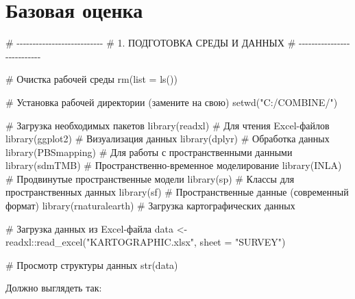 \documentclass[
  letterpaper,
  DIV=11,
  numbers=noendperiod]{scrreprt}
\newenvironment{Shaded}{\begin{snugshade}}{\end{snugshade}}
\newcommand{\AttributeTok}[1]{\textcolor[rgb]{0.40,0.45,0.13}{#1}}
\newcommand{\CommentTok}[1]{\textcolor[rgb]{0.37,0.37,0.37}{#1}}
\newcommand{\FunctionTok}[1]{\textcolor[rgb]{0.28,0.35,0.67}{#1}}
\newcommand{\NormalTok}[1]{\textcolor[rgb]{0.00,0.23,0.31}{#1}}
\newcommand{\OtherTok}[1]{\textcolor[rgb]{0.00,0.23,0.31}{#1}}
\newcommand{\SpecialCharTok}[1]{\textcolor[rgb]{0.37,0.37,0.37}{#1}}
\newcommand{\StringTok}[1]{\textcolor[rgb]{0.13,0.47,0.30}{#1}}
\begin{document}
\section{Базовая
оценка}\label{ux431ux430ux437ux43eux432ux430ux44f-ux43eux446ux435ux43dux43aux430}

\begin{Shaded}
\begin{Highlighting}[]
\CommentTok{\# {-}{-}{-}{-}{-}{-}{-}{-}{-}{-}{-}{-}{-}{-}{-}{-}{-}{-}{-}{-}{-}{-}{-}{-}{-}{-}{-}}
\CommentTok{\# 1. ПОДГОТОВКА СРЕДЫ И ДАННЫХ}
\CommentTok{\# {-}{-}{-}{-}{-}{-}{-}{-}{-}{-}{-}{-}{-}{-}{-}{-}{-}{-}{-}{-}{-}{-}{-}{-}{-}{-}{-}}

\CommentTok{\# Очистка рабочей среды}
\FunctionTok{rm}\NormalTok{(}\AttributeTok{list =} \FunctionTok{ls}\NormalTok{())}

\CommentTok{\# Установка рабочей директории (замените на свою)}
\FunctionTok{setwd}\NormalTok{(}\StringTok{"C:/COMBINE/"}\NormalTok{)}

\CommentTok{\# Загрузка необходимых пакетов}
\FunctionTok{library}\NormalTok{(readxl)       }\CommentTok{\# Для чтения Excel{-}файлов}
\FunctionTok{library}\NormalTok{(ggplot2)      }\CommentTok{\# Визуализация данных}
\FunctionTok{library}\NormalTok{(dplyr)        }\CommentTok{\# Обработка данных}
\FunctionTok{library}\NormalTok{(PBSmapping)   }\CommentTok{\# Для работы с пространственными данными}
\FunctionTok{library}\NormalTok{(sdmTMB)       }\CommentTok{\# Пространственно{-}временное моделирование}
\FunctionTok{library}\NormalTok{(INLA)         }\CommentTok{\# Продвинутые пространственные модели}
\FunctionTok{library}\NormalTok{(sp)           }\CommentTok{\# Классы для пространственных данных}
\FunctionTok{library}\NormalTok{(sf)           }\CommentTok{\# Пространственные данные (современный формат)}
\FunctionTok{library}\NormalTok{(rnaturalearth) }\CommentTok{\# Загрузка картографических данных}

\CommentTok{\# Загрузка данных из Excel{-}файла}
\NormalTok{data }\OtherTok{\textless{}{-}}\NormalTok{ readxl}\SpecialCharTok{::}\FunctionTok{read\_excel}\NormalTok{(}\StringTok{"KARTOGRAPHIC.xlsx"}\NormalTok{, }\AttributeTok{sheet =} \StringTok{"SURVEY"}\NormalTok{)}

\CommentTok{\# Просмотр структуры данных}
\FunctionTok{str}\NormalTok{(data)}
\end{Highlighting}
\end{Shaded}

Должно выглядеть так:
\end{document}

